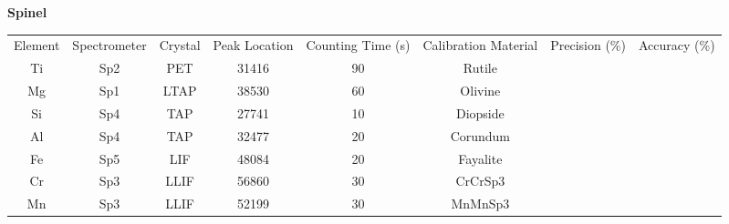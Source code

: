 \begin{table}[!htbp]
\begin{subtable}[h]{1\textwidth}
\centering
\small \textbf{Spinel} \\ 
\centering
\vspace{5pt}
\begin{adjustbox}{width=1\textwidth, center=\textwidth}
\begin{tabular}{c c c c c c c c}
\hline 
\multirow{3}{*}{Element} & \multirow{3}{*}{Spectrometer} & \multirow{3}{*}{Crystal} & \multirow{3}{*}{Peak Location} & \multirow{3}{2cm}{\centering Counting Time (s)}  & \multirow{3}{2cm}{\centering Calibration Material} & \multirow{3}{*}{Precision (\%)} & \multirow{3}{*}{Accuracy (\%)}\\ 
\\ 
\\
\hline
Ti & Sp2 & PET & 31416 & 90 & Rutile & & \\
Mg & Sp1 & LTAP & 38530 & 60 & Olivine & & \\
Si & Sp4 & TAP & 27741 & 10 & Diopside & & \\
Al & Sp4 & TAP & 32477 & 20 & Corundum & & \\
Fe & Sp5 & LIF & 48084 & 20 & Fayalite & & \\
Cr & Sp3 & LLIF & 56860 & 30 & CrCrSp3 & & \\
Mn & Sp3 & LLIF & 52199 & 30 & MnMnSp3 & & \\
\hline 
\end{tabular}
\end{adjustbox}
\vspace{3pt}
\end{subtable}
\end{table}

